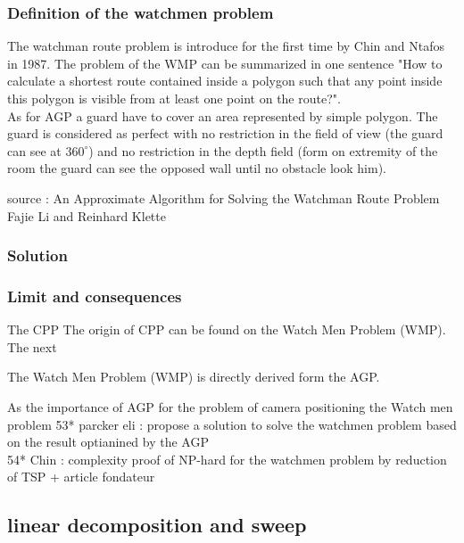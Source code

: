 \subsubsection{Definition of the watchmen problem }

The watchman route problem is introduce for the first time by Chin and Ntafos in 1987. The problem of the WMP can be summarized in one sentence "How to calculate a shortest route contained inside a polygon such that any point inside this polygon is visible from at least one point on the route?".  \\
As for AGP a guard have to cover an area represented by simple polygon. The guard is considered as perfect with no restriction in the field of view (the guard can see at $360^\circ$) and no restriction in the depth field (form on extremity of the room the guard can see the opposed wall until no obstacle look him).

 source : An Approximate Algorithm for Solving the Watchman Route Problem Fajie Li and Reinhard Klette
\subsubsection{Solution} 


\subsubsection{Limit and consequences}

The CPP 
The origin of CPP can be found on the Watch Men Problem (WMP). The next

The Watch Men Problem (WMP) is directly derived form the AGP. 

As the importance of AGP for the problem of camera positioning  the Watch men problem 
53* parcker eli :  propose a solution  to solve the watchmen problem based on the result optianined by the AGP \\ 
54* Chin : complexity proof of NP-hard  for the watchmen problem by reduction of TSP + article fondateur




\subsection{linear decomposition and sweep}
